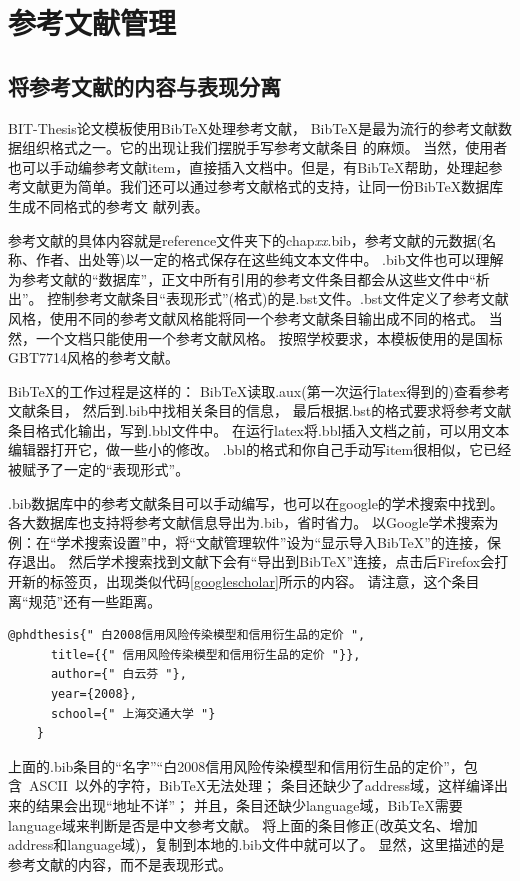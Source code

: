 \section{参考文献管理}
\label{sec:reference}
\subsection{将参考文献的内容与表现分离}

BIT-Thesis论文模板使用BibTeX处理参考文献，
BibTeX是最为流行的参考文献数据组织格式之一。它的出现让我们摆脱手写参考文献条目
的麻烦。
当然，使用者也可以手动编参考文献item，直接插入文档中。但是，有BibTeX帮助，处理起参考文献更为简单。我们还可以通过参考文献格式的支持，让同一份BibTeX数据库生成不同格式的参考文
献列表。

参考文献的具体内容就是reference文件夹下的chap\textit{xx}.bib，参考文献的元数据(名称、作者、出处等)以一定的格式保存在这些纯文本文件中。
.bib文件也可以理解为参考文献的``数据库''，正文中所有引用的参考文件条目都会从这些文件中``析出''。
控制参考文献条目``表现形式''(格式)的是.bst文件。.bst文件定义了参考文献风格，使用不同的参考文献风格能将同一个参考文献条目输出成不同的格式。
当然，一个文档只能使用一个参考文献风格。
按照学校要求，本模板使用的是国标GBT7714风格的参考文献。

BibTeX的工作过程是这样的：
BibTeX读取.aux(第一次运行latex得到的)查看参考文献条目，
然后到.bib中找相关条目的信息，
最后根据.bst的格式要求将参考文献条目格式化输出，写到.bbl文件中。
在运行latex将.bbl插入文档之前，可以用文本编辑器打开它，做一些小的修改。
.bbl的格式和你自己手动写item很相似，它已经被赋予了一定的``表现形式''。

.bib数据库中的参考文献条目可以手动编写，也可以在google的学术搜索中找到。
各大数据库也支持将参考文献信息导出为.bib，省时省力。
以Google学术搜索为例：在``学术搜索设置''中，将``文献管理软件''设为``显示导入BibTeX''的连接，保存退出。
然后学术搜索找到文献下会有``导出到BibTeX''连接，点击后Firefox会打开新的标签页，出现类似代码\ref{googlescholar}所示的内容。
请注意，这个条目离``规范''还有一些距离。

  \begin{lstlisting}[caption={从Google Scholar找到的，但并不规范的.bib条目}, label=googlescholar, float, escapeinside="", numbers=none]
    @phdthesis{" 白2008信用风险传染模型和信用衍生品的定价 ",
      title={{" 信用风险传染模型和信用衍生品的定价 "}},
      author={" 白云芬 "},
      year={2008},
      school={" 上海交通大学 "}
    } 
  \end{lstlisting}

  上面的.bib条目的``名字''\cndash{}``白2008信用风险传染模型和信用衍生品的定价''，包含~ASCII~以外的字符，BibTeX无法处理；
  条目还缺少了address域，这样编译出来的结果会出现``地址不详''；
  并且，条目还缺少language域，BibTeX需要language域来判断是否是中文参考文献。
  将上面的条目修正(改英文名、增加address和language域)，复制到本地的.bib文件中就可以了。
  显然，这里描述的是参考文献的内容，而不是表现形式。

